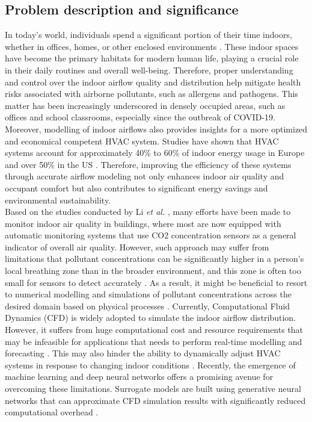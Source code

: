 \documentclass[final-report]{article-template}
\begin{document}
\subsection{Problem description and significance}
In today's world, individuals spend a significant portion of their time indoors, whether in offices, homes, or other enclosed environments \cite{klepeis2001national}. These indoor spaces have become the primary habitats for modern human life, playing a crucial role in their daily routines and overall well-being. Therefore, proper understanding and control over the indoor airflow quality and distribution help mitigate health risks associated with airborne pollutants, such as allergens and pathogens. This matter has been increasingly underscored in densely occupied areas, such as offices and school classrooms, especially since the outbreak of COVID-19. Moreover, modelling of indoor airflows also provides insights for a more optimized and economical competent HVAC system. Studies have shown that HVAC systems account for approximately 40\% to 60\% of indoor energy usage in Europe and over 50\% in the US \cite{Solano2021HVAC}. Therefore, improving the efficiency of these systems through accurate airflow modeling not only enhances indoor air quality and occupant comfort but also contributes to significant energy savings and environmental sustainability.\\

Based on the studies conducted by Li \textit{et al.} \cite{Li2022coupled}, many efforts have been made to monitor indoor air quality in buildings, where most are now equipped with automatic monitoring systems that use CO2 concentration sensors as a general indicator of overall air quality. However, such approach may suffer from limitations that pollutant concentrations can be significantly higher in a person's local breathing zone than in the broader environment, and this zone is often too small for sensors to detect accurately \cite{eilts2021characterization}. As a result, it might be beneficial to resort to numerical modelling and simulations of pollutant concentrations across the desired domain based on physical processes \cite{Li2022coupled}. Currently, Computational Fluid Dynamics (CFD) is widely adopted to simulate the indoor airflow distribution. However, it suffers from huge computational cost and resource requirements that may be infeasible for applications that needs to perform real-time modelling and forecasting \cite{faulkner2023fast, Bhattacharyya21}. This may also hinder the ability to dynamically adjust HVAC systems in response to changing indoor conditions \cite{walters2013investigation}. Recently, the emergence of machine learning and deep neural networks offers a promising avenue for overcoming these limitations. Surrogate models are built using generative neural networks that can approximate CFD simulation results with significantly reduced computational overhead \cite{Li2022coupled, faulkner2023fast}. 
\end{document}
